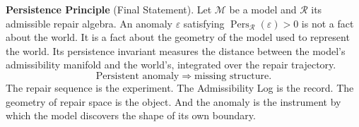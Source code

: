 \documentclass[12pt,oneside]{book}
\theoremstyle{plain}
\theoremstyle{definition}
\theoremstyle{remark}
\DeclareMathOperator{\Pers}{Pers}
\newcommand{\R}{\mathcal{R}}
\newcommand{\M}{\mathcal{M}}
\newcommand{\eps}{\varepsilon}
\newcommand{\1}{\mathbf{1}}
\begin{document}
\noindent\textbf{Persistence Principle} (Final Statement). Let $\M$ be a model and $\R$ its admissible repair algebra. An anomaly $\eps$ satisfying $\Pers_{\R}(\eps) > 0$ is not a fact about the world. It is a fact about the geometry of the model used to represent the world. Its persistence invariant measures the distance between the model's admissibility manifold and the world's, integrated over the repair trajectory.
\[
\text{Persistent anomaly} \;\Longrightarrow\; \text{missing structure.}
\]
The repair sequence is the experiment. The Admissibility Log is the record. The geometry of repair space is the object. And the anomaly is the instrument by which the model discovers the shape of its own boundary.

\end{document}
